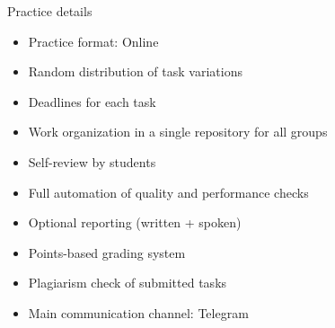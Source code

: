 \documentclass{beamer}
\begin{document}
\begin{frame}{Practice details}
    \begin{itemize}
        \item Practice format: Online
        \item Random distribution of task variations
        \item Deadlines for each task
        \item Work organization in a single repository for all groups
        \item Self-review by students
        \item Full automation of quality and performance checks
        \item Optional reporting (written + spoken)
        \item Points-based grading system
        \item Plagiarism check of submitted tasks
        \item Main communication channel: Telegram
    \end{itemize}
\end{frame}
\end{document}
